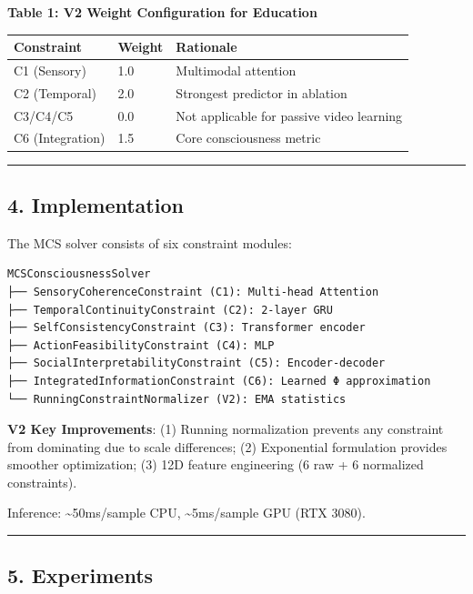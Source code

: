 \documentclass[
]{article}
\newcounter{none} %
\begin{document}
\textbf{Table 1: V2 Weight Configuration for Education}

{\def\LTcaptype{none} %
\begin{longtable}[]{@{}lll@{}}
\toprule\noalign{}
Constraint & Weight & Rationale \\
\midrule\noalign{}
\endhead
\bottomrule\noalign{}
\endlastfoot
C1 (Sensory) & 1.0 & Multimodal attention \\
C2 (Temporal) & 2.0 & Strongest predictor in ablation \\
C3/C4/C5 & 0.0 & Not applicable for passive video learning \\
C6 (Integration) & 1.5 & Core consciousness metric \\
\end{longtable}
}

\begin{center}\rule{0.5\linewidth}{0.5pt}\end{center}

\subsection{4. Implementation}\label{implementation}

The MCS solver consists of six constraint modules:

\begin{verbatim}
MCSConsciousnessSolver
├── SensoryCoherenceConstraint (C1): Multi-head Attention
├── TemporalContinuityConstraint (C2): 2-layer GRU
├── SelfConsistencyConstraint (C3): Transformer encoder
├── ActionFeasibilityConstraint (C4): MLP
├── SocialInterpretabilityConstraint (C5): Encoder-decoder
├── IntegratedInformationConstraint (C6): Learned Φ approximation
└── RunningConstraintNormalizer (V2): EMA statistics
\end{verbatim}

\textbf{V2 Key Improvements}: (1) Running normalization prevents any
constraint from dominating due to scale differences; (2) Exponential
formulation provides smoother optimization; (3) 12D feature engineering
(6 raw + 6 normalized constraints).

Inference: \textasciitilde50ms/sample CPU, \textasciitilde5ms/sample GPU
(RTX 3080).

\begin{center}\rule{0.5\linewidth}{0.5pt}\end{center}

\subsection{5. Experiments}\label{experiments}
\end{document}
